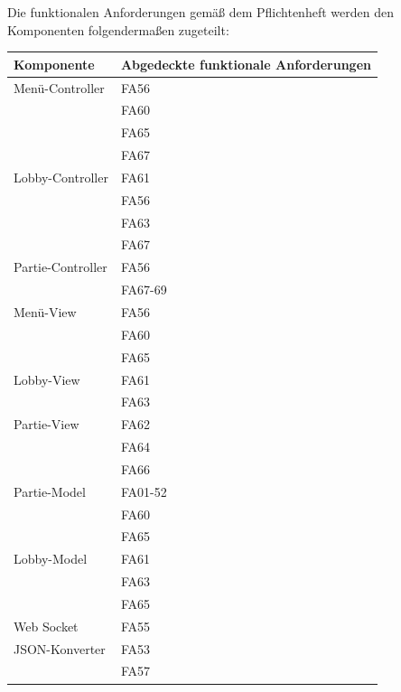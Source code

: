 	Die funktionalen Anforderungen gemäß dem Pflichtenheft werden den Komponenten folgendermaßen zugeteilt:

	\begin{tabular}{|l|l|}
		\hline
		\textbf{Komponente} & \textbf{Abgedeckte funktionale Anforderungen}\\ \hline
		Menü-Controller & FA56 \\ 
		& FA60 \\
		& FA65 \\
		& FA67 \\ \hline
		
		Lobby-Controller & FA61 \\
		& FA56 \\
		& FA63 \\
		& FA67 \\ \hline
		
		Partie-Controller & FA56 \\
		&  FA67-69 \\
		
		Menü-View & FA56 \\ 
		& FA60 \\
		& FA65 \\ \hline
		
		Lobby-View & FA61 \\ 
		& FA63 \\ \hline
		
		Partie-View & FA62 \\ 
		& FA64 \\ 
		& FA66 \\ \hline
		
		Partie-Model & FA01-52 \\ 
		& FA60 \\
		& FA65 \\ \hline
		
		Lobby-Model & FA61 \\ 
		& FA63 \\
		& FA65 \\ \hline
		
		Web Socket & FA55 \\ \hline
		
		JSON-Konverter & FA53 \\
		& FA57\\ \hline
	
\end{tabular}